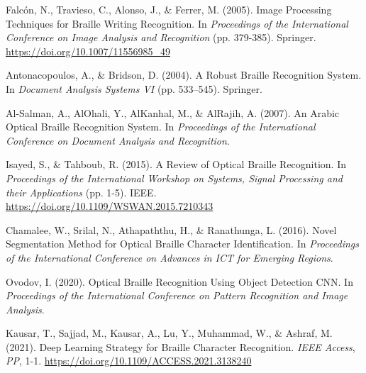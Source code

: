
\patchcmd{\thebibliography}{\section*}{\section}{}{}

\renewcommand\thesection{} 

\begin{thebibliography}{99}

Falcón, N., Travieso, C., Alonso, J., \& Ferrer, M. (2005). 
 Image Processing Techniques for Braille Writing Recognition. 
 In \textit{Proceedings of the International Conference on Image Analysis and Recognition} (pp. 379-385). Springer. \url{https://doi.org/10.1007/11556985_49}

    Antonacopoulos, A., \& Bridson, D. (2004). 
    A Robust Braille Recognition System. 
    In \textit{Document Analysis Systems VI} (pp. 533–545). Springer.

    Al-Salman, A., AlOhali, Y., AlKanhal, M., \& AlRajih, A. (2007). 
    An Arabic Optical Braille Recognition System. 
    In \textit{Proceedings of the International Conference on Document Analysis and Recognition}.

    Isayed, S., \& Tahboub, R. (2015). 
    A Review of Optical Braille Recognition. 
    In \textit{Proceedings of the International Workshop on Systems, Signal Processing and their Applications} (pp. 1-5). IEEE. \url{https://doi.org/10.1109/WSWAN.2015.7210343}

    Chamalee, W., Srilal, N., Athapaththu, H., \& Ranathunga, L. (2016). 
    Novel Segmentation Method for Optical Braille Character Identification. 
    In \textit{Proceedings of the International Conference on Advances in ICT for Emerging Regions}.

    Ovodov, I. (2020). 
    Optical Braille Recognition Using Object Detection CNN. 
    In \textit{Proceedings of the International Conference on Pattern Recognition and Image Analysis}.

    Kausar, T., Sajjad, M., Kausar, A., Lu, Y., Muhammad, W., \& Ashraf, M. (2021). 
    Deep Learning Strategy for Braille Character Recognition. 
    \textit{IEEE Access}, \textit{PP}, 1-1. \url{https://doi.org/10.1109/ACCESS.2021.3138240}


\end{thebibliography}
